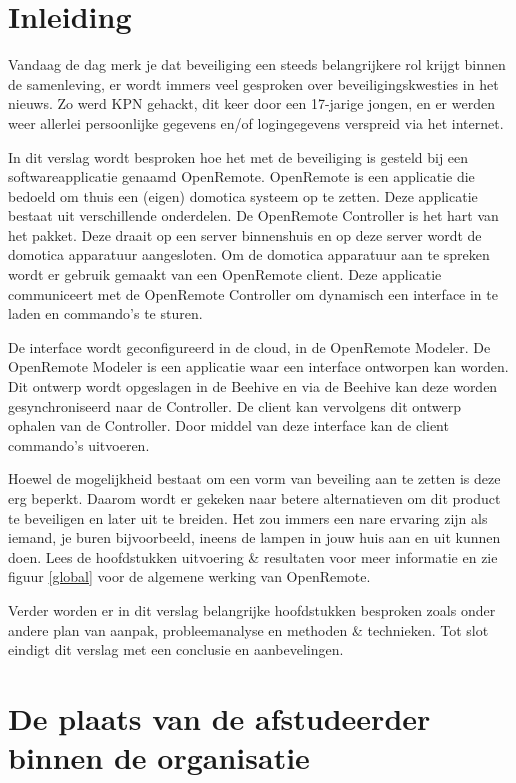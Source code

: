 \documentclass[]{article}
\begin{document}
\newpage
\section{Inleiding}
Vandaag de dag merk je dat beveiliging een steeds belangrijkere rol krijgt binnen
de samenleving, er wordt immers veel gesproken over beveiligingskwesties in
het nieuws. Zo werd KPN gehackt, dit keer door een 17-jarige jongen, en
er werden weer allerlei persoonlijke gegevens en/of logingegevens verspreid via het
internet.

In dit verslag wordt besproken hoe het met de beveiliging is gesteld bij een
softwareapplicatie genaamd OpenRemote. OpenRemote is een applicatie die
bedoeld om thuis een (eigen) domotica systeem op te zetten. Deze applicatie
bestaat uit verschillende onderdelen. De OpenRemote Controller is het hart van
het pakket. Deze draait op een server binnenshuis en op deze server wordt de
domotica apparatuur aangesloten. Om de domotica apparatuur aan te spreken wordt
er gebruik gemaakt van een OpenRemote client. Deze applicatie communiceert met de
OpenRemote Controller om dynamisch een interface in te laden en commando's te
sturen. 

De interface wordt geconfigureerd in de cloud, in de OpenRemote Modeler. De
OpenRemote Modeler is een applicatie waar een interface ontworpen kan worden.
Dit ontwerp wordt opgeslagen in de Beehive en via de Beehive kan deze worden
gesynchroniseerd naar de Controller. De client kan vervolgens dit ontwerp
ophalen van de Controller. Door middel van deze interface kan de client
commando's uitvoeren. 

Hoewel de mogelijkheid bestaat om een vorm van beveiling aan te zetten is deze
erg beperkt. Daarom wordt er gekeken naar betere alternatieven om dit product te
beveiligen en later uit te breiden. Het zou immers een nare ervaring zijn als
iemand, je buren bijvoorbeeld, ineens de lampen in jouw huis aan en uit kunnen
doen. Lees de hoofdstukken uitvoering \& resultaten voor meer informatie en zie
figuur \ref{global} voor de algemene werking van OpenRemote.

Verder worden er in dit verslag belangrijke hoofdstukken besproken zoals onder andere
plan van aanpak, probleemanalyse en methoden \& technieken.
Tot slot eindigt dit verslag met een conclusie en aanbevelingen.

\newpage
\section{De plaats van de afstudeerder binnen de organisatie}
\end{document}
